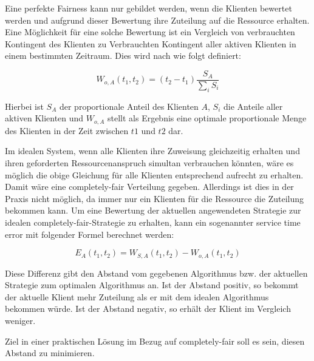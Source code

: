 Eine perfekte Fairness kann nur gebildet werden, wenn die Klienten bewertet werden und aufgrund dieser Bewertung ihre Zuteilung auf die Ressource erhalten.
Eine Möglichkeit für eine solche Bewertung ist ein Vergleich von verbrauchten Kontingent des Klienten zu Verbrauchten Kontingent aller aktiven Klienten in einem bestimmten Zeitraum. 
Dies wird nach \cite{usenix} wie folgt definiert:

\begin{equation}
W_{o,A}(t_1,t_2) = (t_2 - t_1) \frac{S_A}{\sum_i S_i}
\label{eq:perfect_fairness}
\end{equation}

Hierbei ist $S_A$ der proportionale Anteil des Klienten $A$, $S_i$ die Anteile aller aktiven Klienten und $W_{o,A}$ stellt als Ergebnis eine optimale proportionale Menge des Klienten in der Zeit zwischen $t1$ und $t2$ dar.

Im idealen System, wenn alle Klienten ihre Zuweisung gleichzeitig erhalten und ihren geforderten Ressourcenanspruch simultan verbrauchen könnten, wäre es möglich die obige Gleichung für alle Klienten entsprechend aufrecht zu erhalten.
Damit wäre eine \glqq completely-fair\grqq{} Verteilung gegeben. Allerdings ist dies in der Praxis nicht möglich, da immer nur ein Klienten für die Ressource die Zuteilung bekommen kann.
Um eine Bewertung der aktuellen angewendeten Strategie zur idealen \glqq completely-fair\grqq-Strategie zu erhalten, kann ein sogenannter \glqq service time error\grqq{} mit folgender Formel berechnet werden:

\begin{equation}
E_A(t_1,t_2) = W_{S,A}(t_1,t_2) - W_{o,A}(t_1,t_2)
\label{eq:perfect_fairness}
\end{equation}

Diese Differenz gibt den Abstand vom gegebenen Algorithmus bzw. der aktuellen Strategie zum optimalen Algorithmus an.
Ist der Abstand positiv, so bekommt der aktuelle Klient mehr Zuteilung als er mit dem idealen Algorithmus bekommen würde. Ist der Abstand negativ, so erhält der Klient im Vergleich weniger.

Ziel in einer praktischen Lösung im Bezug auf \glqq completely-fair\grqq{} soll es sein, diesen Abstand zu minimieren.
 



